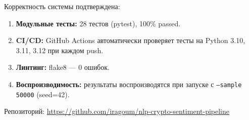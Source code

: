\documentclass[a4paper,12pt]{article}
\begin{document}
Корректность системы подтверждена:

\begin{enumerate}
  \item \textbf{Модульные тесты:} 28 тестов (pytest), 100\% passed.
  \item \textbf{CI/CD:} GitHub Actions автоматически проверяет тесты
        на Python 3.10, 3.11, 3.12 при каждом push.
  \item \textbf{Линтинг:} flake8 --- 0 ошибок.
  \item \textbf{Воспроизводимость:} результаты воспроизводятся при запуске
        с \texttt{--sample 50000} (seed=42).
\end{enumerate}

Репозиторий: \url{https://github.com/iragoum/nlp-crypto-sentiment-pipeline}
\end{document}
